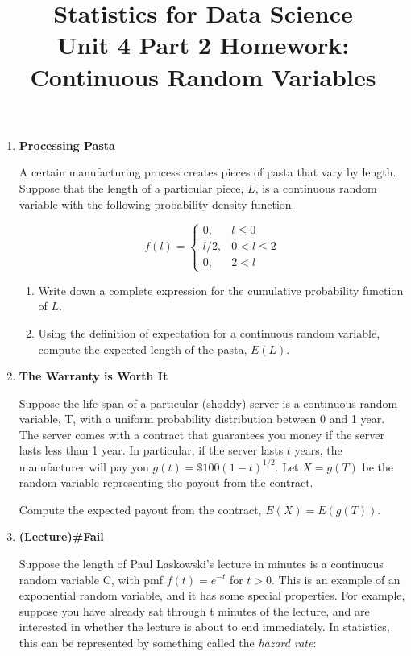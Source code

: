 \documentclass[12pt,a4paper]{article}
\numberwithin{equation}{subsection}
\begin{document}
\title{Statistics for Data Science \\
       Unit 4 Part 2 Homework: Continuous Random Variables}
\maketitle

\begin{enumerate}

\item \textbf{Processing Pasta}

A certain manufacturing process creates pieces of pasta that vary by length.  Suppose that the length of a particular piece, $L$, is a continuous random variable with the following probability density function.

$$f(l) = \begin{cases} 0, &l \leq 0 \\
l/2, &0 < l \leq 2 \\ 
0, &2 < l
\end{cases}
$$

\begin{enumerate}
\item Write down a complete expression for the cumulative probability function of $L$.
\item Using the definition of expectation for a continuous random variable, compute the expected length of the pasta, $E(L)$.
\end{enumerate}

\item \textbf{The Warranty is Worth It}

Suppose the life span of a particular (shoddy) server is a continuous random variable, T, with a uniform probability distribution between 0 and 1 year.  The server comes with a contract that guarantees you money if the server lasts less than 1 year.  In particular, if the server lasts $t$ years, the manufacturer will pay you $g(t)= \$100(1-t)^{1/2}$.  Let $X = g(T)$ be the random variable representing the payout from the contract.

Compute the expected payout from the contract, $E(X) = E(g(T))$.

\item \textbf{(Lecture)\#Fail}

Suppose the length of Paul Laskowski's lecture in minutes is a continuous random variable C, with pmf $f(t) = e^{-t}$ for $t > 0$.  This is an example of an exponential random variable, and it has some special properties.  For example, suppose you have already sat through t minutes of the lecture, and are interested in whether the lecture is about to end immediately.  In statistics, this can be represented by something called the \textit{hazard rate}:


\end{enumerate}
\end{document}
